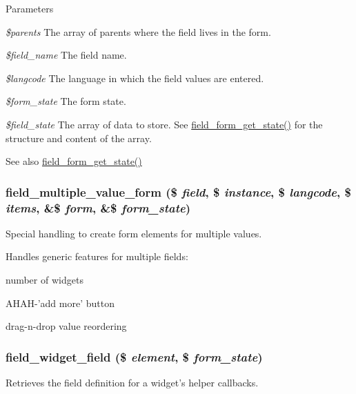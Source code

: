 \begin{DoxyParams}{Parameters}
\item[{\em \$parents}]The array of parents where the field lives in the form. \item[{\em \$field\_\-name}]The field name. \item[{\em \$langcode}]The language in which the field values are entered. \item[{\em \$form\_\-state}]The form state. \item[{\em \$field\_\-state}]The array of data to store. See \hyperlink{field_8form_8inc_a84146d3d086bfc6b242f01c23e552435}{field\_\-form\_\-get\_\-state()} for the structure and content of the array.\end{DoxyParams}
\begin{DoxySeeAlso}{See also}
\hyperlink{field_8form_8inc_a84146d3d086bfc6b242f01c23e552435}{field\_\-form\_\-get\_\-state()} 
\end{DoxySeeAlso}
\hypertarget{field_8form_8inc_a46777a9ee9b54599b953ef7d6fd6b422}{
\subsubsection[{field\_\-multiple\_\-value\_\-form}]{\setlength{\rightskip}{0pt plus 5cm}field\_\-multiple\_\-value\_\-form (\$ {\em field}, \/  \$ {\em instance}, \/  \$ {\em langcode}, \/  \$ {\em items}, \/  \&\$ {\em form}, \/  \&\$ {\em form\_\-state})}}
\label{field_8form_8inc_a46777a9ee9b54599b953ef7d6fd6b422}
Special handling to create form elements for multiple values.

Handles generic features for multiple fields:
\begin{DoxyItemize}
\item number of widgets
\item AHAH-\/'add more' button
\item drag-\/n-\/drop value reordering 
\end{DoxyItemize}\hypertarget{field_8form_8inc_a71dcef632fc59641eee5238c7c6b335c}{
\subsubsection[{field\_\-widget\_\-field}]{\setlength{\rightskip}{0pt plus 5cm}field\_\-widget\_\-field (\$ {\em element}, \/  \$ {\em form\_\-state})}}
\label{field_8form_8inc_a71dcef632fc59641eee5238c7c6b335c}
Retrieves the field definition for a widget's helper callbacks.


